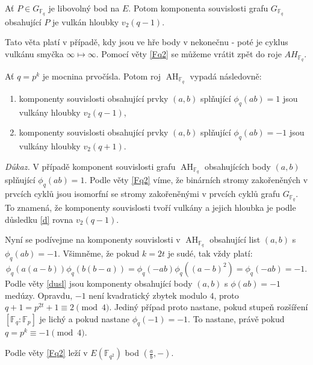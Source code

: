 \documentclass[12pt]{report}
\DeclareMathOperator{\AH}{AH}
\begin{document}
\begin{dusledek}\label{d}
Ať $P \in G_{\mathbb{F}_q}$ je libovolný bod na $E$. Potom komponenta souvislosti grafu $G_{\mathbb{F}_q}$ obsahující $P$ je vulkán hloubky $v_2(q-1)$.
\end{dusledek}

Tato věta platí v případě, kdy jsou ve hře body v nekonečnu - poté je cyklus vulkánu smyčka $\infty \longmapsto \infty$. Pomocí věty \ref{Fq2} se můžeme vrátit zpět do roje $AH_{\mathbb{F}_q}$.

\begin{veta}
Ať $q = p^k$ je mocnina prvočísla. Potom roj $\AH_{\mathbb{F}_q}$ vypadá následovně:
\begin{enumerate}
\item komponenty souvislosti obsahující prvky $(a,b)$ splňující $\phi_q (ab) = 1$ jsou vulkány hloubky $v_2(q-1)$,
\item komponenty souvislosti obsahující prvky $(a,b)$ splňující $\phi_q (ab) = -1$ jsou vulkány hloubky $v_2 (q+1)$.
\end{enumerate} 
\end{veta}

\noindent \textit{Důkaz.} V případě komponent souvislosti grafu $\AH_{\mathbb{F}_q}$ obsahujících body $(a,b)$ splňující $\phi_q(ab) = 1$. Podle věty \ref{Fq2} víme, že binárních stromy zakořeněných v prvcích cyklů jsou isomorfní se stromy zakořeněnými v prvcích cyklů grafu $G_{\mathbb{F}_q}$. To znamená, že komponenty souvislosti tvoří vulkány a jejich hloubka je podle důsledku \ref{d} rovna $v_2 (q-1)$. 

Nyní se podívejme na komponenty souvislosti v $\AH_{\mathbb{F}_q}$ obsahující list $(a,b)$ s $\phi_q(ab) = -1$. Všimněme, že pokud $k = 2t$ je sudé, tak vždy platí: $$\phi_q(a(a-b)) \phi_q(b(b-a)) =\phi_q(-ab) \phi_q((a-b)^2) = \phi_q(-ab) =-1.$$
Podle věty \ref{dusl} jsou komponenty obsahující body $(a,b)$ s $\phi(ab) = -1$ medúzy. Opravdu, $-1$ není kvadratický zbytek modulo $4$, proto $q + 1= p^{2t}+1 \equiv 2 \pmod{4}$. Jediný  případ proto nastane, pokud stupeň rozšíření $[\mathbb{F}_q : \mathbb{F}_p]$ je lichý a pokud nastane $\phi_q(-1) = -1$. To nastane, právě pokud $q=p^k \equiv  -1 \pmod{4}$.

Podle věty \ref{Fq2} leží v $E(\mathbb{F}_{q^2})$ bod $\left( \frac{a}{b},- \right)$.  


\end{document}

